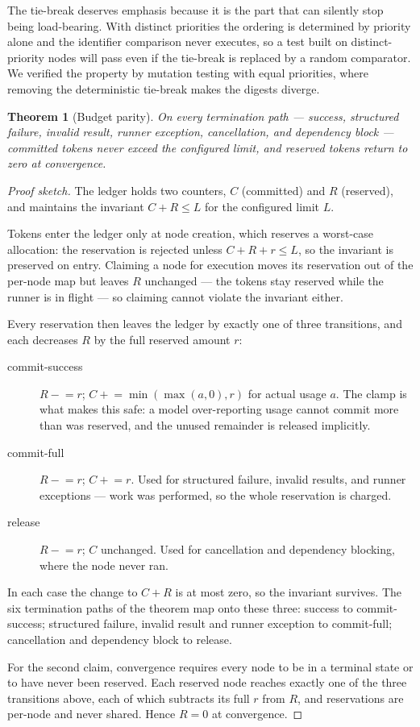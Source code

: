 \documentclass[10pt]{article}
\newtheorem{theorem}{Theorem}
\begin{document}
The tie-break deserves emphasis because it is the part that can silently stop
being load-bearing. With distinct priorities the ordering is determined by
priority alone and the identifier comparison never executes, so a test built on
distinct-priority nodes will pass even if the tie-break is replaced by a random
comparator. We verified the property by mutation testing with equal priorities,
where removing the deterministic tie-break makes the digests diverge.

\begin{theorem}[Budget parity]
\label{thm:budget}
On every termination path --- success, structured failure, invalid result,
runner exception, cancellation, and dependency block --- committed tokens never
exceed the configured limit, and reserved tokens return to zero at convergence.
\end{theorem}

\begin{proof}[Proof sketch]
The ledger holds two counters, $C$ (committed) and $R$ (reserved), and
maintains the invariant $C + R \leq L$ for the configured limit $L$.

Tokens enter the ledger only at node creation, which reserves a worst-case
allocation: the reservation is rejected unless $C + R + r \leq L$, so the
invariant is preserved on entry. Claiming a node for execution moves its
reservation out of the per-node map but leaves $R$ unchanged --- the tokens stay
reserved while the runner is in flight --- so claiming cannot violate the
invariant either.

Every reservation then leaves the ledger by exactly one of three transitions,
and each decreases $R$ by the full reserved amount $r$:
\begin{description}
\item[commit-success] $R \mathrel{-}= r$; $C \mathrel{+}= \min(\max(a, 0), r)$
      for actual usage $a$. The clamp is what makes this safe: a model
      over-reporting usage cannot commit more than was reserved, and the unused
      remainder is released implicitly.
\item[commit-full] $R \mathrel{-}= r$; $C \mathrel{+}= r$. Used for structured
      failure, invalid results, and runner exceptions --- work was performed,
      so the whole reservation is charged.
\item[release] $R \mathrel{-}= r$; $C$ unchanged. Used for cancellation and
      dependency blocking, where the node never ran.
\end{description}
In each case the change to $C + R$ is at most zero, so the invariant survives.
The six termination paths of the theorem map onto these three: success to
commit-success; structured failure, invalid result and runner exception to
commit-full; cancellation and dependency block to release.

For the second claim, convergence requires every node to be in a terminal state
or to have never been reserved. Each reserved node reaches exactly one of the
three transitions above, each of which subtracts its full $r$ from $R$, and
reservations are per-node and never shared. Hence $R = 0$ at convergence.
\end{proof}
\end{document}
